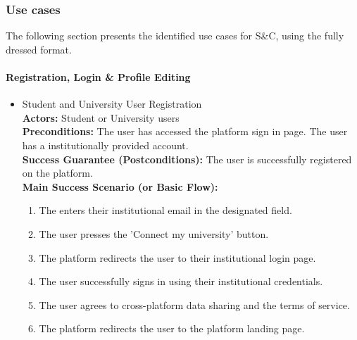 \subsubsection{Use cases}
The following section presents the identified use cases for S\&C, using the fully dressed format.

\paragraph{Registration, Login \& Profile Editing}
\begin{itemize}[label={[\textbf{UC}]}, align=left, leftmargin=*]
     \item {} Student and University User Registration\\
     \textbf{Actors:} Student or University users\\
     \textbf{Preconditions:} The user has accessed the platform sign in page. The user has a institutionally provided account.\\
     \textbf{Success Guarantee (Postconditions):} The user is successfully registered on the platform.\\
     \textbf{Main Success Scenario (or Basic Flow):} 
     \begin{enumerate}[label=\arabic*.] 
        \item The enters their institutional email in the designated field.
        \item The user presses the 'Connect my university' button.
        \item The platform redirects the user to their institutional login page.
        \item The user successfully signs in using their institutional credentials.
        \item The user agrees to cross-platform data sharing and the terms of service.
        \item The platform redirects the user to the platform landing page.
     \end{enumerate} \\


\end{itemize}
